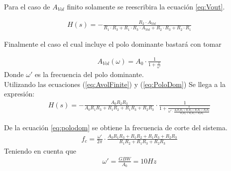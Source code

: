 Para el caso de $A_{Vol}$ finito solamente se reescribira la ecuación \ref{eq:Vout}.

\begin{align}
H(s)= -\frac{R_2\cdot A_{Vol}}{R_1\cdot R_3+R_1\cdot R_3 \cdot A_{Vol} +R_2\cdot R_3+R_2\cdot R_1}
\label{eq:AvolFinite}
\end{align}

Finalmente el caso el cual incluye el polo dominante bastará con tomar 

\begin{align}A_{Vol}(\omega)=A_0 \cdot \frac{1}{1+\frac{s}{\omega'}}
\label{eq:PoloDom}
\end{align}
Donde $\omega'$ es la frecuencia del polo dominante.\\
Utilizando las ecuaciones (\ref{eq:AvolFinite}) y (\ref{eq:PoloDom})
Se llega a la expresión:
\begin{align}
\label{eq:polodom}
H(s)=-\frac{A_0R_2R_3}{A_0R_1R_3+R_1R_2+R_1R_3+R_2R_3} \cdot\frac{1}{1+\frac{s}{\omega' \cdot \frac{A_0R_1R_3+R_1R_2+R_1R_3+R_2R_3}{R_1R_2+R_1R_3+R_2R_3}}}
\end{align}

De la ecuación \ref{eq:polodom} se obtiene la frecuencia de corte del sistema.
\begin{align}
f_c=\frac{\omega'}{2\pi} \cdot \frac{A_0R_1R_3+R_1R_2+R_1R_3+R_2R_3}{R_1R_2+R_1R_3+R_2R_3}
\end{align}
Teniendo en cuenta que
\begin{align}
\omega'=\frac{GBW}{A_0} = 10Hz
\end{align}

